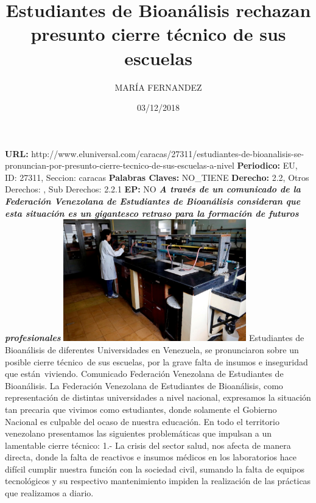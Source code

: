 \documentclass{article}%
\title{\textbf{Estudiantes de Bioanálisis rechazan  presunto cierre técnico de sus escuelas}}%
\author{MARÍA FERNANDEZ}%
\date{03/12/2018}%
\begin{document}
%
\normalsize%
\maketitle%
\textbf{URL: }%
http://www.eluniversal.com/caracas/27311/estudiantes{-}de{-}bioanalisis{-}se{-}pronuncian{-}por{-}presunto{-}cierre{-}tecnico{-}de{-}sus{-}escuelas{-}a{-}nivel\newline%
%
\textbf{Periodico: }%
EU, %
ID: %
27311, %
Seccion: %
caracas\newline%
%
\textbf{Palabras Claves: }%
NO\_TIENE\newline%
%
\textbf{Derecho: }%
2.2, %
Otros Derechos: %
, %
Sub Derechos: %
2.2.1\newline%
%
\textbf{EP: }%
NO\newline%
\newline%
%
\textbf{\textit{A través de un comunicado de la Federación Venezolana de Estudiantes de Bioanálisis consideran que esta situación es un gigantesco retraso para la formación de futuros profesionales}}%
\newline%
\newline%
%
\includegraphics[width=300px]{85.jpg}%
\newline%
%
Estudiantes de Bioanálisis de diferentes Universidades en Venezuela, se pronunciaron sobre un posible cierre técnico~de sus escuelas, por la grave falta de insumos e inseguridad que están~viviendo.%
\newline%
%
Comunicado Federación Venezolana de Estudiantes de Bioanálisis.%
\newline%
%
La Federación Venezolana de Estudiantes de Bioanálisis, como representación de distintas universidades a nivel nacional, expresamos la situación tan precaria que vivimos como estudiantes, donde solamente el Gobierno Nacional es culpable del ocaso de nuestra educación. En todo el territorio venezolano presentamos las siguientes problemáticas que impulsan a un lamentable cierre técnico:%
\newline%
%
1.{-} La crisis del sector salud, nos afecta de manera directa, donde la falta de reactivos e insumos médicos en los laboratorios hace difícil cumplir nuestra función con la sociedad civil, sumando la falta de equipos tecnológicos y su respectivo mantenimiento impiden la realización de las prácticas que realizamos a diario.%
\end{document}
